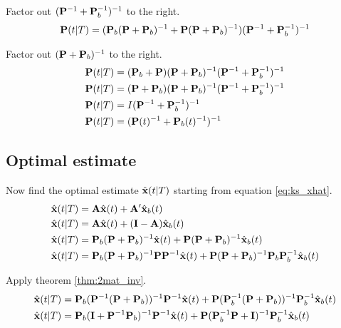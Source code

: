 Factor out $(\mathbf{P}^{-1} + \mathbf{P}_b^{-1})^{-1}$ to the right.
\begin{equation*}
  \mathbf{P}(t|T) =
    (\mathbf{P}_b(\mathbf{P} + \mathbf{P}_b)^{-1} + \mathbf{P}(\mathbf{P} + \mathbf{P}_b)^{-1})
    (\mathbf{P}^{-1} + \mathbf{P}_b^{-1})^{-1}
\end{equation*}

Factor out $(\mathbf{P} + \mathbf{P}_b)^{-1}$ to the right.
\begin{align}
  \mathbf{P}(t|T) &=
    (\mathbf{P}_b + \mathbf{P})(\mathbf{P} + \mathbf{P}_b)^{-1}
    (\mathbf{P}^{-1} + \mathbf{P}_b^{-1})^{-1} \nonumber \\
  \mathbf{P}(t|T) &=
    (\mathbf{P} + \mathbf{P}_b)(\mathbf{P} + \mathbf{P}_b)^{-1}
    (\mathbf{P}^{-1} + \mathbf{P}_b^{-1})^{-1} \nonumber \\
  \mathbf{P}(t|T) &= I(\mathbf{P}^{-1} + \mathbf{P}_b^{-1})^{-1} \nonumber \\
  \mathbf{P}(t|T) &= (\mathbf{P}(t)^{-1} + \mathbf{P}_b(t)^{-1})^{-1}
    \label{eq:ks_error_cov}
\end{align}

\subsection{Optimal estimate}

Now find the optimal estimate $\hat{\mathbf{x}}(t|T)$ starting from equation
\eqref{eq:ks_xhat}.
\begin{align*}
  \hat{\mathbf{x}}(t|T) &= \mathbf{A}\hat{\mathbf{x}}(t) + \mathbf{A}'\hat{\mathbf{x}}_b(t) \\
  \hat{\mathbf{x}}(t|T) &= \mathbf{A}\hat{\mathbf{x}}(t) +
    (\mathbf{I} - \mathbf{A})\hat{\mathbf{x}}_b(t) \\
  \hat{\mathbf{x}}(t|T) &=
    \mathbf{P}_b(\mathbf{P} + \mathbf{P}_b)^{-1}\hat{\mathbf{x}}(t) +
    \mathbf{P}(\mathbf{P} + \mathbf{P}_b)^{-1}\hat{\mathbf{x}}_b(t) \\
  \hat{\mathbf{x}}(t|T) &=
    \mathbf{P}_b(\mathbf{P} + \mathbf{P}_b)^{-1}\mathbf{P}\mathbf{P}^{-1}\hat{\mathbf{x}}(t) +
    \mathbf{P}(\mathbf{P} + \mathbf{P}_b)^{-1}\mathbf{P}_b\mathbf{P}_b^{-1}\hat{\mathbf{x}}_b(t)
\end{align*}

Apply theorem \ref{thm:2mat_inv}.
\begin{align*}
  \hat{\mathbf{x}}(t|T) &=
    \mathbf{P}_b(\mathbf{P}^{-1}(\mathbf{P} + \mathbf{P}_b))^{-1}
      \mathbf{P}^{-1}\hat{\mathbf{x}}(t) +
    \mathbf{P}(\mathbf{P}_b^{-1}(\mathbf{P} + \mathbf{P}_b))^{-1}
      \mathbf{P}_b^{-1}\hat{\mathbf{x}}_b(t) \\
  \hat{\mathbf{x}}(t|T) &=
    \mathbf{P}_b(\mathbf{I} + \mathbf{P}^{-1}\mathbf{P}_b)^{-1}
      \mathbf{P}^{-1}\hat{\mathbf{x}}(t) +
    \mathbf{P}(\mathbf{P}_b^{-1}\mathbf{P} + \mathbf{I})^{-1}
      \mathbf{P}_b^{-1}\hat{\mathbf{x}}_b(t)
\end{align*}

